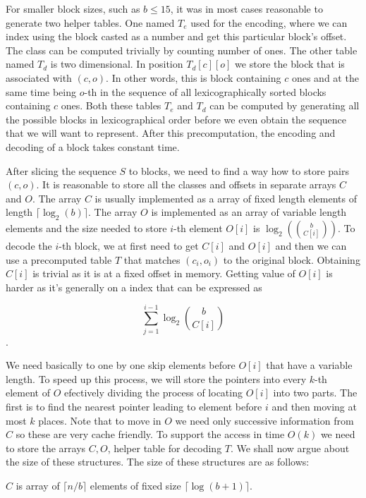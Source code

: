 For smaller block sizes, such as $b\leq 15$, it was in most cases reasonable to
generate two helper tables. One named $T_e$ used for the encoding, where we can
index using the block casted as a number and get this particular block's offset.
The class can be computed trivially by counting number of ones. The other table
named $T_d$ is two dimensional. In position $T_d[c][o]$ we store the block that
is associated with $(c, o)$. In other words, this is block containing $c$ ones
and at the same time being $o$-th in the sequence of all lexicographically sorted
blocks containing $c$ ones. Both these tables $T_e$ and $T_d$ can be computed
by generating all the possible blocks in lexicographical order before we even
obtain the sequence that we will want to represent. After this precomputation,
the encoding and decoding of a block takes constant time.

After slicing the sequence $S$ to blocks, we need to find a way how to store
pairs $(c, o)$. It is reasonable to store all the classes and offsets in separate
arrays $C$ and $O$. The array $C$ is usually implemented as a array of fixed length
elements of length $\lceil \log_2(b)\rceil$. The array $O$ is implemented as an
array of variable length elements and the size needed to store $i$-th element $O[i]$ is
$\log_2({b\choose C[i]})$. To decode the $i$-th block, we at first need to get
$C[i]$ and $O[i]$ and then we can use a precomputed table $T$ that matches $(c_i, o_i)$
to the original block. Obtaining $C[i]$ is trivial as it is at a fixed offset in
memory. Getting value of $O[i]$ is harder as it's generally on a index that can
be expressed as

                    $$\sum_{j=1}^{i-1} \log_2{b\choose C[i]}$$.

We need basically to one by one skip elements before $O[i]$ that have a variable
length. To speed up this process, we will store the pointers into every $k$-th
element of $O$ efectively dividing the process of locating $O[i]$ into two parts.
The first is to find the nearest pointer leading to element before $i$ and then
moving at most $k$ places. Note that to move in $O$ we need only successive
information from $C$ so these are very cache friendly. To support the access in
time $O(k)$ we need to store the arrays $C, O$, helper table for decoding $T$.
We shall now argue about the size of these structures. The size of these structures
are as follows:

$C$ is array of $\lceil n/b \rceil$ elements of fixed size $\lceil \log(b+1) \rceil$.

